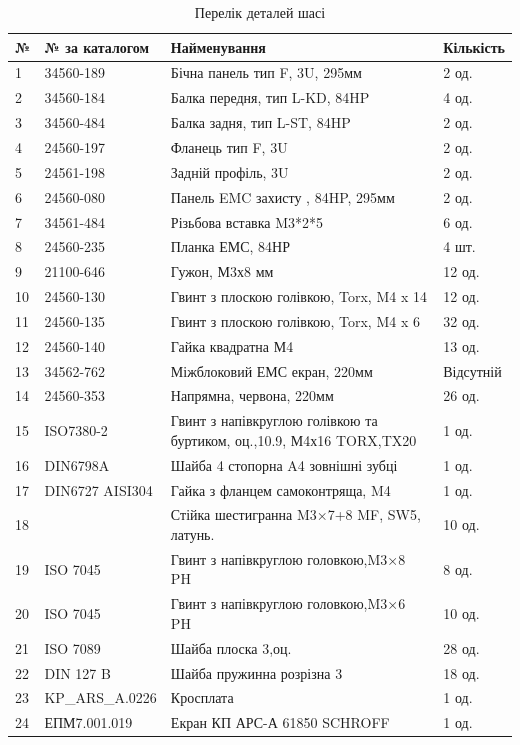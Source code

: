\begin{table}[H]
    \centering
  \caption{Перелік деталей шасі}
    \begin{tabular}{|p{0.8cm}|p{3.2cm}|p{7.5cm}|p{2cm}|} 
        \hline
        \textbf{№} & \textbf{№ за каталогом} & \textbf{Найменування} & \textbf{Кількість} \\ \hline
        1 & 34560-189 & Бічна панель тип F, 3U, 295мм  & 2 од. \\ \hline
        2 & 34560-184 & Балка передня, тип L-KD, 84HP & 4 од. \\ \hline
        3 & 34560-484 & Балка задня, тип L-ST, 84HP & 2 од. \\ \hline
        4 & 24560-197 & Фланець тип F, 3U & 2 од. \\ \hline
        5 & 24561-198 & Задній профіль, 3U & 2 од. \\ \hline
        6 & 24560-080 & Панель EMC захисту , 84HP, 295мм & 2 од. \\ \hline
        7 & 34561-484 & Різьбова вставка M3*2*5 & 6 од. \\ \hline
        8 & 24560-235 & Планка ЕМС, 84НР & 4 шт. \\ \hline
        9 & 21100-646 & Гужон, М3х8 мм & 12 од. \\ \hline
       10 & 24560-130 & Гвинт з плоскою голівкою, Torx, M4 x 14 & 12 од. \\ \hline
       11 & 24560-135 & Гвинт з плоскою голівкою, Torx, M4 x 6 & 32 од. \\ \hline
       12 & 24560-140 & Гайка квадратна М4 & 13 од. \\ \hline
       13 & 34562-762 & Міжблоковий ЕМС екран, 220мм & Відсутній \\ \hline
       14 & 24560-353 & Напрямна, червона, 220мм & 26 од. \\ \hline
       15 & ISO7380-2 & Гвинт з напівкруглою голівкою та буртиком, оц.,10.9, М4х16 TORX,TX20 & 1 од. \\ \hline
       16 & DIN6798A & Шайба 4 стопорна A4 зовнішні зубці & 1 од. \\ \hline
       17 & DIN6727 AISI304 & Гайка з фланцем самоконтряща, M4 & 1 од. \\ \hline
       18 &  & Стійка шестигранна M3×7+8 MF, SW5, латунь. & 10 од. \\ \hline
       19 & ISO 7045 & Гвинт з напівкруглою головкою,M3×8 PH & 8 од. \\ \hline
       20 & ISO 7045 & Гвинт з напівкруглою головкою,M3×6 PH & 10 од. \\ \hline
       21 & ISO 7089 & Шайба плоска 3,оц. & 28 од. \\ \hline
       22 & DIN 127 B & Шайба пружинна розрізна 3 & 18 од. \\ \hline
       23 & KP_ARS_A.0226 & Кросплата & 1 од. \\ \hline
       24 & ЕПМ7.001.019 & Екран КП АРС-А 61850 SCHROFF & 1 од. \\ \hline
   
    \end{tabular}
    
\end{table}

